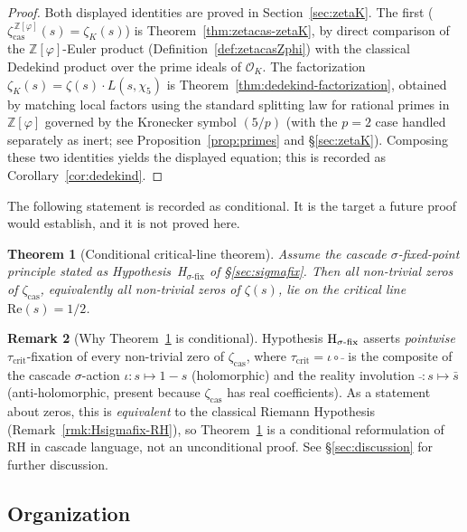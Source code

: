 \documentclass[11pt, a4paper]{amsart}
\newtheorem{theorem}{Theorem}[section]
\theoremstyle{definition}
\newtheorem{remark}[theorem]{Remark}
\newcommand{\Z}{\mathbb{Z}}
\newcommand{\pphi}{\varphi}
\newcommand{\zetacas}{\zeta_{\mathrm{cas}}}
\begin{document}
\begin{proof}
Both displayed identities are proved in
Section~\ref{sec:zetaK}.  The first
($\zetacas^{\,\Z[\pphi]}(s) = \zeta_K(s)$) is
Theorem~\ref{thm:zetacas-zetaK}, by direct comparison of the
$\Z[\pphi]$-Euler product (Definition~\ref{def:zetacasZphi}) with
the classical Dedekind product over the prime ideals of
$\mathcal{O}_K$.  The factorization
$\zeta_K(s) = \zeta(s) \cdot L(s, \chi_5)$ is
Theorem~\ref{thm:dedekind-factorization}, obtained by matching
local factors using the standard splitting law for rational primes
in $\Z[\pphi]$ governed by the Kronecker symbol $(5/p)$ (with the
$p=2$ case handled separately as inert; see
Proposition~\ref{prop:primes} and \S\ref{sec:zetaK}).  Composing these two identities yields the
displayed equation; this is recorded as
Corollary~\ref{cor:dedekind}.
\end{proof}

The following statement is recorded as conditional. It is the
target a future proof would establish, and it is not proved here.

\begin{theorem}[Conditional critical-line theorem]\label{thm:RH}
Assume the cascade $\sigma$-fixed-point principle stated as
Hypothesis~\textup{H$_{\sigma\text{-fix}}$} of \S\ref{sec:sigmafix}.
Then all non-trivial zeros of $\zetacas$, equivalently all
non-trivial zeros of $\zeta(s)$, lie on the critical line
$\mathrm{Re}(s) = 1/2$.
\end{theorem}

\begin{remark}[Why Theorem~\ref{thm:RH} is conditional]\label{rmk:rh-conditional}
Hypothesis $\textup{H}_{\sigma\text{-fix}}$ asserts \emph{pointwise}
$\tau_{\mathrm{crit}}$-fixation of every non-trivial zero of $\zetacas$, where
$\tau_{\mathrm{crit}} = \iota \circ \bar{\ }$ is the composite of the cascade
$\sigma$-action $\iota: s \mapsto 1-s$ (holomorphic) and the
reality involution $\bar{\ }: s \mapsto \bar{s}$ (anti-holomorphic,
present because $\zetacas$ has real coefficients). As a statement
about zeros, this is \emph{equivalent} to the classical Riemann
Hypothesis (Remark~\ref{rmk:Hsigmafix-RH}), so
Theorem~\ref{thm:RH} is a conditional reformulation of RH in
cascade language, not an unconditional proof. See
\S\ref{sec:discussion} for further discussion.
\end{remark}

\subsection{Organization}
\end{document}
